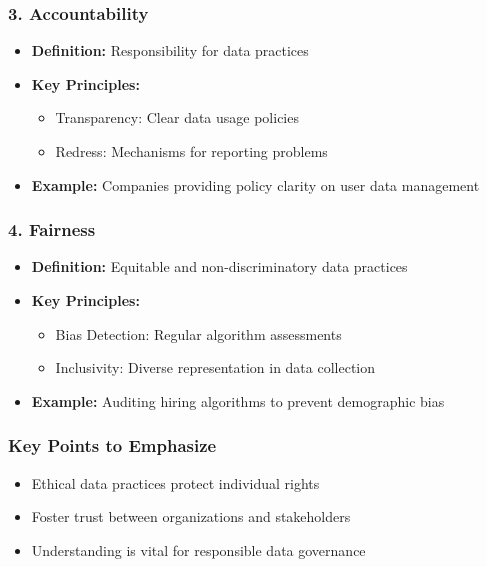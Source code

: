 \documentclass[aspectratio=169]{beamer}
\begin{document}
\begin{frame}[fragile]
    \frametitle{3. Accountability}
    \begin{itemize}
        \item \textbf{Definition:} Responsibility for data practices
        \item \textbf{Key Principles:}
        \begin{itemize}
            \item Transparency: Clear data usage policies
            \item Redress: Mechanisms for reporting problems
        \end{itemize}
        \item \textbf{Example:} Companies providing policy clarity on user data management
    \end{itemize}
\end{frame}

\begin{frame}[fragile]
    \frametitle{4. Fairness}
    \begin{itemize}
        \item \textbf{Definition:} Equitable and non-discriminatory data practices
        \item \textbf{Key Principles:}
        \begin{itemize}
            \item Bias Detection: Regular algorithm assessments
            \item Inclusivity: Diverse representation in data collection
        \end{itemize}
        \item \textbf{Example:} Auditing hiring algorithms to prevent demographic bias
    \end{itemize}
\end{frame}

\begin{frame}[fragile]
    \frametitle{Key Points to Emphasize}
    \begin{itemize}
        \item Ethical data practices protect individual rights
        \item Foster trust between organizations and stakeholders
        \item Understanding is vital for responsible data governance
    \end{itemize}
\end{frame}
\end{document}
